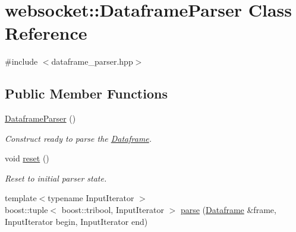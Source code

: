 \hypertarget{classwebsocket_1_1DataframeParser}{}\section{websocket\+:\+:Dataframe\+Parser Class Reference}
\label{classwebsocket_1_1DataframeParser}


{\ttfamily \#include $<$dataframe\+\_\+parser.\+hpp$>$}

\subsection*{Public Member Functions}
\begin{DoxyCompactItemize}
\item 
\hyperlink{classwebsocket_1_1DataframeParser_a813241a177df63aff6cb174e1bdebaff}{Dataframe\+Parser} ()
\begin{DoxyCompactList}\small\item\em Construct ready to parse the \hyperlink{structwebsocket_1_1Dataframe}{Dataframe}. \end{DoxyCompactList}\item 
void \hyperlink{classwebsocket_1_1DataframeParser_a247fd15250481e4c82cd9eb436ea158e}{reset} ()
\begin{DoxyCompactList}\small\item\em Reset to initial parser state. \end{DoxyCompactList}\item 
{\footnotesize template$<$typename Input\+Iterator $>$ }\\boost\+::tuple$<$ boost\+::tribool, Input\+Iterator $>$ \hyperlink{classwebsocket_1_1DataframeParser_add0317d2a579c37ac92d5157c8a9b638}{parse} (\hyperlink{structwebsocket_1_1Dataframe}{Dataframe} \&frame, Input\+Iterator begin, Input\+Iterator end)
\end{DoxyCompactItemize}
